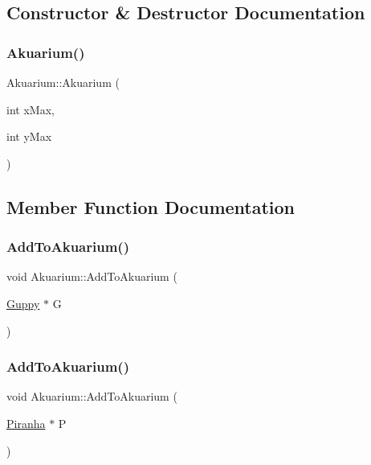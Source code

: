 \subsection{Constructor \& Destructor Documentation}
\mbox{\label{class_akuarium_a09356fa0405a5c8db4b048665456e1ce}} 
\subsubsection{\texorpdfstring{Akuarium()}{Akuarium()}}
{\footnotesize\ttfamily Akuarium\+::\+Akuarium (\begin{DoxyParamCaption}\item[{int}]{x\+Max,  }\item[{int}]{y\+Max }\end{DoxyParamCaption})}



\subsection{Member Function Documentation}
\mbox{\label{class_akuarium_acd7f2fd40ce2ca063c3ddfacf1a84ea3}} 
\subsubsection{\texorpdfstring{Add\+To\+Akuarium()}{AddToAkuarium()}\hspace{0.1cm}{\footnotesize\ttfamily [1/4]}}
{\footnotesize\ttfamily void Akuarium\+::\+Add\+To\+Akuarium (\begin{DoxyParamCaption}\item[{\mbox{\hyperlink{class_guppy}{Guppy}} $\ast$}]{G }\end{DoxyParamCaption})}

\mbox{\label{class_akuarium_a167b796ece0cdd537c5c6624ed15760c}} 
\subsubsection{\texorpdfstring{Add\+To\+Akuarium()}{AddToAkuarium()}\hspace{0.1cm}{\footnotesize\ttfamily [2/4]}}
{\footnotesize\ttfamily void Akuarium\+::\+Add\+To\+Akuarium (\begin{DoxyParamCaption}\item[{\mbox{\hyperlink{class_piranha}{Piranha}} $\ast$}]{P }\end{DoxyParamCaption})}

